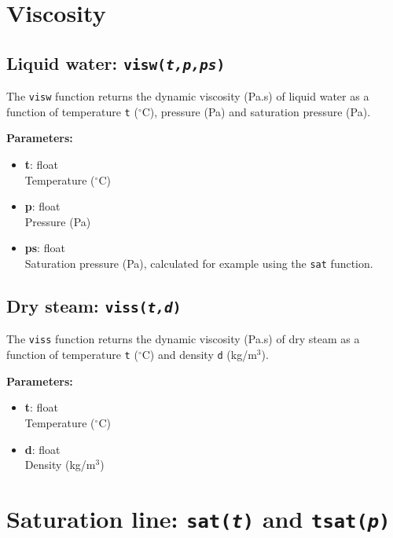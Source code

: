 \section{Viscosity}

\begin{snugshade}
\subsection{Liquid water: \texttt{visw(\emph{t,p,ps})}}
\end{snugshade}
\label{sec:t2thermo:visw}

The \texttt{visw} function returns the dynamic viscosity (Pa.s) of liquid water as a function of temperature \texttt{t} ($^{\circ}$C), pressure (Pa) and saturation pressure (Pa).

\textbf{Parameters:}
\begin{itemize}
\item \textbf{t}: float\\
  Temperature ($^{\circ}$C)
\item \textbf{p}: float\\
  Pressure (Pa)
\item \textbf{ps}: float\\
  Saturation pressure (Pa), calculated for example using the \texttt{sat} function.
\end{itemize}

\begin{snugshade}
\subsection{Dry steam: \texttt{viss(\emph{t,d})}}
\end{snugshade}
\label{sec:t2thermo:viss}

The \texttt{viss} function returns the dynamic viscosity (Pa.s) of dry steam as a function of temperature \texttt{t} ($^{\circ}$C) and density \texttt{d} (kg/m$^3$).

\textbf{Parameters:}
\begin{itemize}
\item \textbf{t}: float\\
  Temperature ($^{\circ}$C)
\item \textbf{d}: float\\
  Density (kg/m$^3$)
\end{itemize}

\section{Saturation line: \texttt{sat(\emph{t})} and \texttt{tsat(\emph{p})}}

